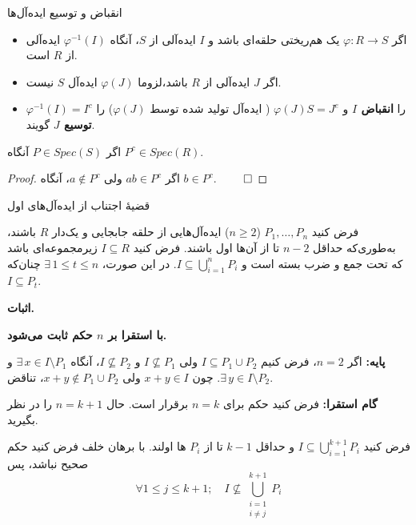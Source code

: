 \begin{frame}[t]{انقباض و توسیع ایده‌آل‌ها}
    \begin{remark}

        \begin{itemize}
            \item اگر $\varphi: R \to S$ یک هم‌ریختی حلقه‌ای باشد و $I$ ایده‌آلی از $S$، آنگاه $\varphi^{-1}(I)$ ایده‌آلی از $R$ است.
            \item اگر $J$ ایده‌آلی از $R$ باشد،لزوما \(\varphi(J)\) ایده‌آل  \(S\) نیست.
            \item $\varphi^{-1}(I) = I^c$ را \textbf{انقباض   $I$} و $\varphi(J)S = J^e$ ({ ایده‌آل تولید شده توسط \(\varphi(J)\)}) را \textbf{ توسیع   $J$} گویند.
        \end{itemize}

    \end{remark}



    \begin{theorem}
        اگر $P \in Spec(S)$ آنگاه $P^c \in Spec(R)$.
    \end{theorem}

    \begin{proof}
        اگر $ab \in P^c$ ولی $a \notin P^c$، آنگاه $b \in P^c$.
        \(\qed\)
    \end{proof}

\end{frame}

\begin{frame}[t]{قضیهٔ اجتناب از ایده‌آل‌های اول}
    \begin{theorem}
        فرض کنید $P_1, \dots, P_n$ (\(n \geq 2\)) ایده‌آل‌هایی از حلقه جابجایی و یک‌دار $R$ باشند، به‌طوری‌که حداقل $n-2$ تا از آن‌ها اول باشند. فرض کنید $I \subseteq R$ زیرمجموعه‌ای باشد که تحت جمع و ضرب بسته است و $I \subseteq \bigcup_{i=1}^n P_i$. در این صورت، $\exists\, 1 \le t \le n$ چنان‌که $I \subseteq P_t$.

    \end{theorem}


    \textbf{اثبات.}

    \textbf{ با استقرا بر $n$ حکم ثابت می‌شود.}

    \textbf{پایه:} اگر $n = 2$، فرض کنیم $I \subseteq P_1 \cup P_2$ ولی $I \not\subseteq P_1$ و $I \not\subseteq P_2$، آنگاه $\exists\, x \in I \setminus P_1$ و $\exists\, y \in I \setminus P_2$. چون $x+y \in I$ ولی $x+y \notin P_1 \cup P_2$، تناقض.

    \textbf{گام استقرا:} فرض کنید حکم برای $n = k$ برقرار است.
    حال $n = k+1$ را در نظر بگیرید.

    فرض کنید $I \subseteq \bigcup_{i=1}^{k+1} P_i$
    و حداقل
    \(k-1\)
    تا از
    \(P_i\)
    ها اولند.
    با برهان خلف فرض کنید حکم صحیح نباشد، پس
    \[
        \forall 1 \le j \le k+1; \quad I \not\subseteq \bigcup_{\substack{i=1\\i \ne j}}^{k+1} P_i
    \]
\end{frame}

